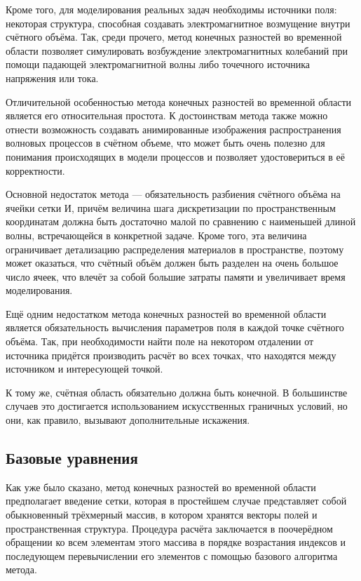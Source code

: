 Кроме того, для моделирования реальных задач необходимы источники поля: некоторая структура, способная создавать электромагнитное возмущение внутри счётного объёма. Так, среди прочего, метод конечных разностей во временной области позволяет симулировать возбуждение электромагнитных колебаний при помощи падающей электромагнитной волны либо точечного источника напряжения или тока.

Отличительной особенностью метода конечных разностей во временной области является его относительная простота. К достоинствам метода также можно отнести возможность создавать анимированные изображения распространения волновых процессов в счётном объеме, что может быть очень полезно для понимания происходящих в модели процессов и позволяет удостовериться в её корректности.

Основной недостаток метода --- обязательность разбиения счётного объёма на ячейки сетки И, причём величина шага дискретизации по пространственным координатам должна быть достаточно малой по сравнению с наименьшей длиной волны, встречающейся в конкретной задаче. Кроме того, эта величина ограничивает детализацию распределения материалов в пространстве, поэтому может оказаться, что счётный объём должен быть разделен на очень большое число ячеек, что влечёт за собой большие затраты памяти и увеличивает время моделирования.

Ещё одним недостатком метода конечных разностей во временной области является обязательность вычисления параметров поля в каждой точке счётного объёма. Так, при необходимости найти поле на некотором отдалении от источника придётся производить расчёт во всех точках, что находятся между источником и интересующей точкой.

К тому же, счётная область обязательно должна быть конечной. В большинстве случаев это достигается использованием искусственных граничных условий, но они, как правило, вызывают дополнительные искажения.

\subsection{Базовые уравнения}

Как уже было сказано, метод конечных разностей во временной области предполагает введение сетки, которая в простейшем случае представляет собой обыкновенный трёхмерный массив, в котором хранятся векторы полей и пространственная структура. Процедура расчёта заключается в поочерёдном обращении ко всем элементам этого массива в порядке возрастания индексов и последующем перевычислении его элементов с помощью базового алгоритма метода.

